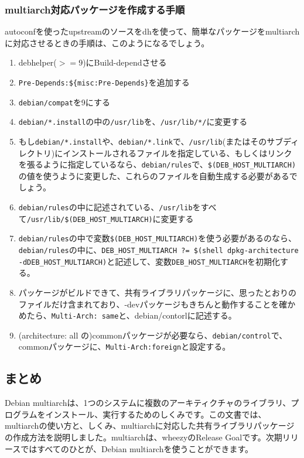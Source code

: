 \documentclass[mingoth,a4paper]{jsarticle}
\begin{document}
\subsubsection{multiarch対応パッケージを作成する手順}
autoconfを使ったupstreamのソースをdhを使って、簡単なパッケージをmultiarchに対応させるときの手順は、このようになるでしょう。
\begin{enumerate}
\item debhelper($>=9$)にBuild-dependさせる
\item {\tt Pre-Depends:\$\{misc:Pre-Depends\}}を追加する
\item {\tt debian/compat}を9にする
\item {\tt debian/*.install}の中の{\tt /usr/lib}を、{\tt /usr/lib/*/}に変更する
\item もし{\tt debian/*.install}や、{\tt debian/*.link}で、{\tt /usr/lib}(またはそのサブディレクトリ)にインストールされるファイルを指定している、もしくはリンクを張るように指定しているなら、{\tt debian/rules}で、{\tt \$(DEB\_HOST\_MULTIARCH)}の値を使うように変更した、これらのファイルを自動生成する必要があるでしょう。
\item {\tt debian/rules}の中に記述されている、{\tt /usr/lib}をすべて{\tt /usr/lib/\$(DEB\_HOST\_MULTIARCH)}に変更する
\item {\tt debian/rules}の中で変数{\tt \$(DEB\_HOST\_MULTIARCH)}を使う必要があるのなら、{\tt debian/rules}の中に、{\tt DEB\_HOST\_MULTIARCH ?= \$(shell dpkg-architecture -dDEB\_HOST\_MULTIARCH)}と記述して、変数{\tt DEB\_HOST\_MULTIARCH}を初期化する。
\item パッケージがビルドできて、共有ライブラリパッケージに、思ったとおりのファイルだけ含まれており、-devパッケージもきちんと動作することを確かめたら、{\tt Multi-Arch: same}と、debian/contorlに記述する。
\item (architecture: all の)commonパッケージが必要なら、{\tt debian/control}で、commonパッケージに、{\tt Multi-Arch:foreign}と設定する。
\end{enumerate}


\subsection{まとめ}
Debian multiarchは、1つのシステムに複数のアーキティクチャのライブラリ、プログラムをインストール、実行するためのしくみです。この文書では、multiarchの使い方と、しくみ、multiarchに対応した共有ライブラリパッケージの作成方法を説明しました。multiarchは、wheezyのRelease Goalです。次期リリースではすべてのひとが、Debian multiarchを使うことができます。
\end{document}
